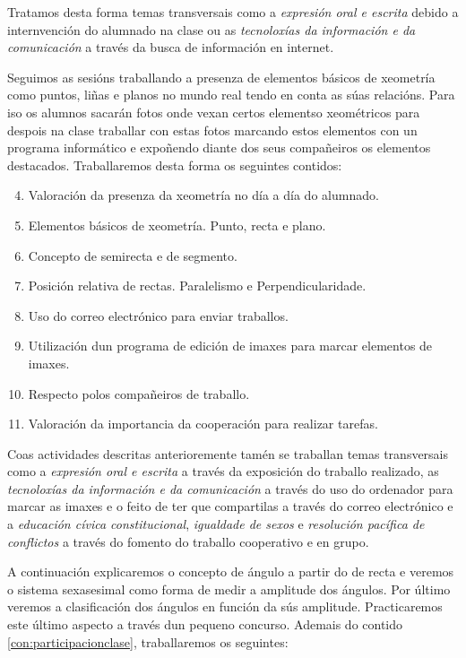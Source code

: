 Tratamos desta forma temas transversais como a \emph{expresión oral e escrita} debido a internvención do alumnado na clase ou as \emph{tecnoloxías da información e da comunicación} a través da busca de información en internet.

Seguimos as sesións traballando a presenza de elementos básicos de xeometría como puntos, liñas e planos no mundo real tendo en conta as súas relacións. Para iso os alumnos sacarán fotos onde vexan certos elementso xeométricos para despois na clase traballar con estas fotos marcando estos elementos con un programa informático e expoñendo diante dos seus compañeiros os elementos destacados. Traballaremos desta forma os seguintes contidos:

\begin{enumerate}[label=\bfseries Con\arabic*, align=left, leftmargin=1.5cm]
    \setcounter{enumi}{3}
    \item\label{con:xeometriacontorna} Valoración da presenza da xeometría no día a día do alumnado.
    \item\label{con:elementosbasicos} Elementos básicos de xeometría. Punto, recta e plano.
    \item\label{con:semirecta} Concepto de semirecta e de segmento.
    \item\label{con:posicionrectas} Posición relativa de rectas. Paralelismo e Perpendicularidade.
    \item\label{con:email} Uso do correo electrónico para enviar traballos.
    \item\label{con:gimp} Utilización dun programa de edición de imaxes para marcar elementos de imaxes.
    \item\label{con:companheiros} Respecto polos compañeiros de traballo.
    \item\label{con:cooperacion} Valoración da importancia da cooperación para realizar tarefas.
\end{enumerate}

Coas actividades descritas anterioremente tamén se traballan temas transversais como a \emph{expresión oral e escrita} a través da exposición do traballo realizado, as \emph{tecnoloxías da información e da comunicación} a través do uso do ordenador para marcar as imaxes e o feito de ter que compartilas a través do correo electrónico e a \emph{educación cívica constitucional}, \emph{igualdade de sexos} e \emph{resolución pacífica de conflictos} a través do fomento do traballo cooperativo e en grupo.

A continuación explicaremos o concepto de ángulo a partir do de recta e veremos o sistema sexasesimal como forma de medir a amplitude dos ángulos. Por último veremos a clasificación dos ángulos en función da sús amplitude. Practicaremos este último aspecto a través dun pequeno concurso. Ademais do contido \ref{con:participacionclase}, traballaremos os seguintes:

